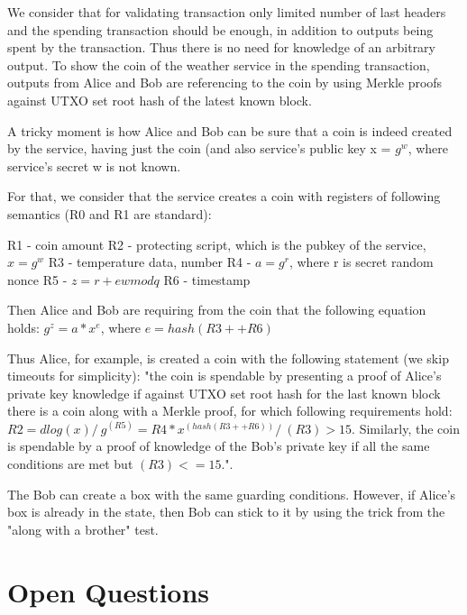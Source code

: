 \documentclass[11pt]{article}
\begin{document}
{We consider that for validating transaction only limited number of last headers and the spending transaction should be enough, in addition to outputs being spent by the transaction. Thus there is no need for knowledge of an arbitrary output. To show the coin of the weather service in the spending transaction, outputs from Alice and Bob are referencing to the coin by using Merkle proofs against UTXO set root hash of the latest known block.
    
A tricky moment is how Alice and Bob can be sure that a coin is indeed created by the service, having just the coin (and also service's public key x = $g^w$, where service's secret w is not known.
    
For that, we consider that the service creates a coin with registers of following semantics (R0 and R1 are standard):
    
R1 - coin amount
R2 - protecting script, which is the pubkey of the service, $x = g^w$
R3 - temperature data, number
R4 - $a = g^r$, where r is secret random nonce
R5 - $z = r + ew mod q$
R6 - timestamp
    
Then Alice and Bob are requiring from the coin that the following equation holds: $g^z = a * x^e$, where $e = hash(R3 ++ R6)$
    
Thus Alice, for example, is created a coin with the following statement (we skip timeouts for simplicity):
"the coin is spendable by presenting a proof of Alice's private key knowledge if against UTXO set root hash for
the last known block there is a coin along with a Merkle proof, for which following requirements hold:
$R2 = dlog(x) /\ g^(R5) = R4 * x^(hash(R3 ++ R6)) /\ (R3) > 15$. Similarly, the coin is spendable by a proof of
knowledge of the Bob's private key if all the same conditions are met but $(R3) <= 15$.".
    
The Bob can create a box with the same guarding conditions. However, if Alice's box is already in the state, then Bob can stick to it by using the trick from the "along with a brother" test.

\section{Open Questions}

}
\end{document}
